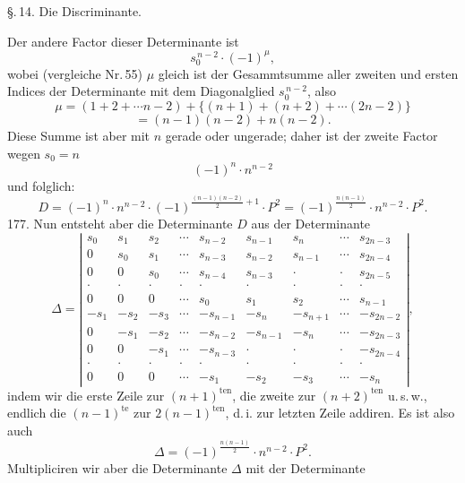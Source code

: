 
\S.\,14. Die Discriminante.

Der andere Factor dieser Determinante ist
\[
s_0^{\,n-2} \cdot (-1)^\mu,
\]
wobei (vergleiche Nr.\,55) $\mu$ gleich ist der Gesammtsumme aller zweiten und ersten Indices der Determinante mit dem Diagonalglied $s_0^{\,n-2}$, also
\[
\mu = (1+2+\cdots n-2) + \{(n+1)+(n+2)+\cdots(2n-2)\}
\]
\[
= (n-1)(n-2) + n(n-2).
\]
Diese Summe ist aber mit $n$ gerade oder ungerade; daher ist der zweite Factor wegen $s_0 = n$
\[
(-1)^n \cdot n^{n-2}
\]
und folglich:
\[
D = (-1)^n \cdot n^{n-2} \cdot (-1)^{\frac{(n-1)(n-2)}{2}+1} \cdot P^2 = (-1)^{\frac{n(n-1)}{2}} \cdot n^{n-2} \cdot P^2 .
\]
177. Nun entsteht aber die Determinante $D$ aus der Determinante
\[
\Delta =
\left|
\begin{array}{ccccccccc}
s_0 & s_1 & s_2 & \cdots & s_{n-2} & s_{n-1} & s_n & \cdots & s_{2n-3} \\
0 & s_0 & s_1 & \cdots & s_{n-3} & s_{n-2} & s_{n-1} & \cdots & s_{2n-4} \\
0 & 0 & s_0 & \cdots & s_{n-4} & s_{n-3} & \cdot & \cdot & s_{2n-5} \\
\cdot & \cdot & \cdot & \cdot & \cdot & \cdot & \cdot & \cdot & \cdot \\
0 & 0 & 0 & \cdots & s_0 & s_1 & s_2 & \cdots & s_{n-1} \\
-s_1 & -s_2 & -s_3 & \cdots & -s_{n-1} & -s_n & -s_{n+1} & \cdots & -s_{2n-2} \\
0 & -s_1 & -s_2 & \cdots & -s_{n-2} & -s_{n-1} & -s_n & \cdots & -s_{2n-3} \\
0 & 0 & -s_1 & \cdots & -s_{n-3} & \cdot & \cdot & \cdot & -s_{2n-4} \\
\cdot & \cdot & \cdot & \cdot & \cdot & \cdot & \cdot & \cdot & \cdot \\
0 & 0 & 0 & \cdots & -s_1 & -s_2 & -s_3 & \cdots & -s_n
\end{array}
\right| ,
\]
indem wir die erste Zeile zur $(n+1)^{\mathrm{ten}}$, die zweite zur $(n+2)^{\mathrm{ten}}$ u.\,s.\,w., endlich die $(n-1)^{\mathrm{te}}$ zur $2(n-1)^{\mathrm{ten}}$, d.\,i. zur letzten Zeile addiren. Es ist also auch
\[
\Delta = (-1)^{\frac{n(n-1)}{2}} \cdot n^{n-2} \cdot P^2 .
\]
Multipliciren wir aber die Determinante $\Delta$ mit der Determinante
